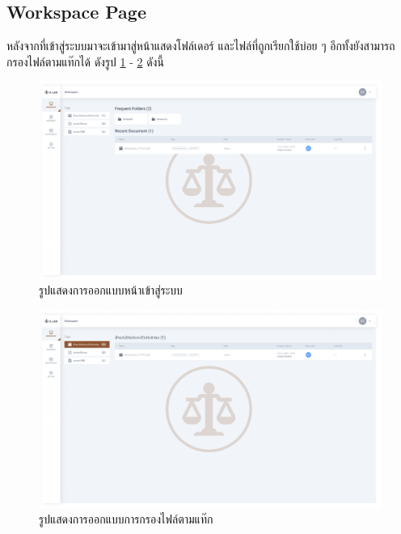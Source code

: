 \documentclass[12pt,oneside,openright,a4paper]{cpe-thai-project}
\begin{document}
\newpage
\subsection{Workspace Page}
\hspace*{1cm} หลังจากที่เข้าสู่ระบบมาจะเข้ามาสู่หน้าแสดงโฟล์เดอร์ และไฟล์ที่ถูกเรียกใช้บ่อย ๆ อีกทั้งยังสามารถกรองไฟล์ตามแท๊กได้ ดังรูป  \ref{fig:workspace-page} - \ref{fig:workspace-tags-filter} ดังนี้
\begin{figure}[!h]\centering
  \includegraphics[width=13cm]{./assets/userinterface/workshop-page.png}
  \caption{รูปแสดงการออกแบบหน้าเข้าสู่ระบบ}\label{fig:workspace-page}
\end{figure}

\begin{figure}[!h]\centering
  \includegraphics[width=13cm]{./assets/userinterface/workshop-tags-filter.png}
  \caption{รูปแสดงการออกแบบการกรองไฟล์ตามแท๊ก}\label{fig:workspace-tags-filter}
\end{figure}

\newpage
\end{document}
